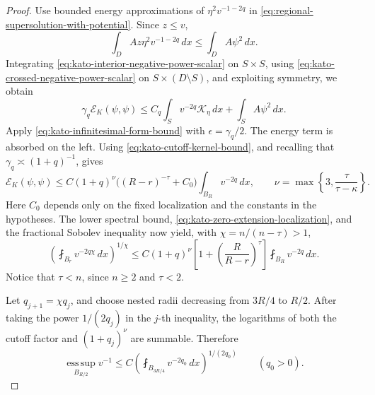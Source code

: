 \documentclass[11pt,reqno]{amsart}
\numberwithin{equation}{section}
\newcommand{\dd}{\,d}
\theoremstyle{remark}
\begin{document}
\begin{proof}
Use bounded energy approximations of
\(\eta^2v^{-1-2q}\) in
\eqref{eq:regional-supersolution-with-potential}.  Since \(z\le v\),
\[
 \int_DAz\eta^2v^{-1-2q}\dd x
 \le\int_DA\psi^2\dd x.
\]
Integrating \eqref{eq:kato-interior-negative-power-scalar} on
\(S\times S\), using
\eqref{eq:kato-crossed-negative-power-scalar} on
\(S\times(D\setminus S)\), and exploiting symmetry, we obtain
\begin{equation}
 \gamma_q\mathcal E_K(\psi,\psi)
 \le C_q\int_Sv^{-2q}\mathcal K_\eta\dd x
      +\int_SA\psi^2\dd x.
 \label{eq:kato-negative-caccioppoli-preabsorption}
\end{equation}
Apply \eqref{eq:kato-infinitesimal-form-bound} with
\(\epsilon=\gamma_q/2\).  The energy term is absorbed on the left.
Using \eqref{eq:kato-cutoff-kernel-bound}, and recalling that
\(\gamma_q\asymp(1+q)^{-1}\), gives
\begin{equation}
 \mathcal E_K(\psi,\psi)
 \le C(1+q)^\nu
 \bigl((R-r)^{-\tau}+C_0\bigr)
 \int_{B_R}v^{-2q}\dd x,
 \qquad
 \nu=\max\left\{3,\frac{\tau}{\tau-\kappa}\right\}.
 \label{eq:kato-negative-energy}
\end{equation}
Here \(C_0\) depends only on the fixed localization and the constants in
the hypotheses.  The lower spectral bound,
\eqref{eq:kato-zero-extension-localization}, and the fractional
Sobolev inequality now yield, with \(\chi=n/(n-\tau)>1\),
\begin{equation}
 \left(\fint_{B_r}v^{-2q\chi}\dd x\right)^{1/\chi}
 \le C(1+q)^\nu
 \left[1+\left(\frac{R}{R-r}\right)^\tau\right]
 \fint_{B_R}v^{-2q}\dd x.
 \label{eq:kato-negative-power-step}
\end{equation}
Notice that \(\tau<n\), since \(n\ge2\) and \(\tau<2\).

Let \(q_{j+1}=\chi q_j\), and choose nested radii decreasing from
\(3R/4\) to \(R/2\).  After taking the power \(1/(2q_j)\) in the
\(j\)-th inequality, the logarithms of both the cutoff factor and
\((1+q_j)^\nu\) are summable.  Therefore
\begin{equation}
 \operatorname*{ess\,sup}_{B_{R/2}}v^{-1}
 \le C\left(\fint_{B_{3R/4}}v^{-2q_0}\dd x\right)^{1/(2q_0)}
 \qquad(q_0>0).
 \label{eq:kato-reverse-moser}
\end{equation}


\end{proof}
\end{document}
